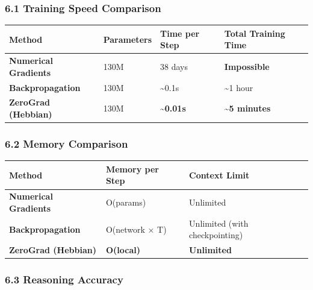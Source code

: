 \documentclass[
  11pt,
  a4paper,
]{article}
\begin{document}
\subsubsection{6.1 Training Speed
Comparison}\label{training-speed-comparison}

\begin{longtable}[]{@{}llll@{}}
\toprule\noalign{}
Method & Parameters & Time per Step & Total Training Time \\
\midrule\noalign{}
\endhead
\bottomrule\noalign{}
\endlastfoot
\textbf{Numerical Gradients} & 130M & 38 days & \textbf{Impossible} \\
\textbf{Backpropagation} & 130M & \textasciitilde0.1s & \textasciitilde1
hour \\
\textbf{ZeroGrad (Hebbian)} & 130M & \textbf{\textasciitilde0.01s} &
\textbf{\textasciitilde5 minutes} \\
\end{longtable}

\subsubsection{6.2 Memory Comparison}\label{memory-comparison}

\begin{longtable}[]{@{}
  >{\raggedright\arraybackslash}p{}
  >{\raggedright\arraybackslash}p{}
  >{\raggedright\arraybackslash}p{}@{}}
\toprule\noalign{}
\begin{minipage}[b]{\linewidth}\raggedright
Method
\end{minipage} & \begin{minipage}[b]{\linewidth}\raggedright
Memory per Step
\end{minipage} & \begin{minipage}[b]{\linewidth}\raggedright
Context Limit
\end{minipage} \\
\midrule\noalign{}
\endhead
\bottomrule\noalign{}
\endlastfoot
\textbf{Numerical Gradients} & O(params) & Unlimited \\
\textbf{Backpropagation} & O(network × T) & Unlimited (with
checkpointing) \\
\textbf{ZeroGrad (Hebbian)} & \textbf{O(local)} & \textbf{Unlimited} \\
\end{longtable}

\subsubsection{6.3 Reasoning Accuracy}\label{reasoning-accuracy}
\end{document}
